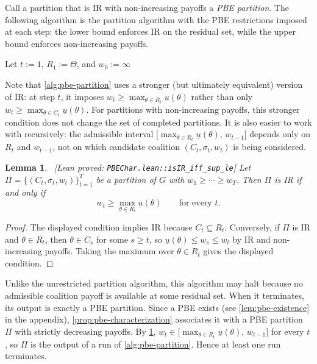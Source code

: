 \documentclass[11pt]{article}
\newtheorem{lemma}{Lemma}
\newcommand{\leanproved}[1]{{\footnotesize\textsf{\textcolor{green!55!black}{[Lean proved: \texttt{#1}]}}}}
\begin{document}
Call a partition that is IR with non-increasing payoffs a \emph{PBE partition}. The following algorithm is the partition algorithm with the PBE restrictions imposed at each step: the lower bound enforces IR on the residual set, while the upper bound enforces non-increasing payoffs.

\begin{algorithm}[ht!]
    \caption{PBE Partition Algorithm}\label{alg:pbe-partition}
    Let $t := 1$, $R_1 := \Theta$, and $w_0 := \infty$\;
\end{algorithm}

Note that \cref{alg:pbe-partition} uses a stronger (but ultimately equivalent) version of IR: at step $t$, it imposes $w_t\geq\max_{\theta\in R_t}\underline{u}(\theta)$ rather than only $w_t\geq\max_{\theta\in C_t}\underline{u}(\theta)$.
For partitions with non-increasing payoffs, this stronger condition does not change the set of completed partitions.
It is also easier to work with recursively: the admissible interval $\bigl[\max_{\theta\in R_t}\underline{u}(\theta),\,w_{t-1}\bigr]$ depends only on $R_t$ and $w_{t-1}$, not on which candidate coalition $(C_t,\sigma_t,w_t)$ is being considered.
\begin{lemma}\label{lem:strong-IR}\ \leanproved{PBEChar.lean::isIR\_iff\_sup\_le}
    Let $\Pi=\{(C_t,\sigma_t,w_t)\}_{t=1}^T$ be a partition of $G$ with $w_1\geq\cdots\geq w_T$. Then $\Pi$ is IR if and only if
    \[
        w_t\geq \max_{\theta\in R_t}\underline{u}(\theta)
        \qquad\text{for every }t.
    \]
\end{lemma}
\begin{proof}
    The displayed condition implies IR because $C_t\subseteq R_t$. Conversely, if $\Pi$ is IR and $\theta\in R_t$, then $\theta\in C_s$ for some $s\geq t$, so $\underline{u}(\theta)\leq w_s\leq w_t$ by IR and non-increasing payoffs. Taking the maximum over $\theta\in R_t$ gives the displayed condition.
\end{proof}

Unlike the unrestricted partition algorithm, this algorithm may halt because no admissible coalition payoff is available at some residual set. When it terminates, its output is exactly a PBE partition. Since a PBE exists (see \cref{lem:pbe-existence} in the appendix), \cref{prop:pbe-characterization} associates it with a PBE partition $\Pi$ with strictly decreasing payoffs. By \cref{lem:strong-IR}, $w_t\in\bigl[\max_{\theta\in R_t}\underline{u}(\theta),\,w_{t-1}\bigr]$ for every $t$, so $\Pi$ is the output of a run of \cref{alg:pbe-partition}. Hence at least one run terminates.
\end{document}
